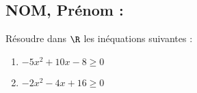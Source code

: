 \documentclass[a4paper,11pt,exos]{nsi} %
\begin{document}


\subsection*{NOM, Prénom : \dotfill} 

\maketitle

\begin{exercice}
    Résoudre dans $\R$ les inéquations suivantes :
    \begin{multicols}{2}
        \begin{enumerate}
            \item $-5x^2+10x-8\geqslant 0$
            \item $-2x^2-4x+16\geqslant 0$
        \end{enumerate}
    \end{multicols}
    
\end{exercice}

\end{document}

